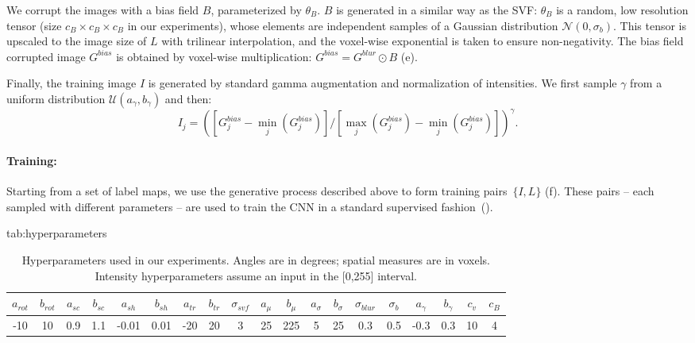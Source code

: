 \documentclass{midl}
\begin{document}
We corrupt the images with a bias field $B$, parameterized by $\theta_B$.  $B$ is generated in a similar way as the SVF: $\theta_B$ is a random, low resolution tensor (size $c_B\times c_B \times c_B$ in our experiments), whose elements are independent samples of a Gaussian distribution $\mathcal{N}(0,\sigma_b)$. This tensor is upscaled to the image size of $L$ with trilinear interpolation, and the voxel-wise exponential is taken to ensure non-negativity. The bias field corrupted image $G^{bias}$ is obtained by voxel-wise multiplication: $G^{bias} = G^{blur} \odot B$ (e). 

Finally, the training image $I$ is generated by standard gamma augmentation and normalization of intensities. We first sample $\gamma$  from a uniform distribution $\mathcal{U}(a_\gamma,b_\gamma)$ and then:
\begin{equation}
\label{eq:intensity_augm}
I_j = \left( [G^{bias}_j - \min_{j}(G^{bias}_j)] \bigg/ [\max_{j}(G^{bias}_j)-\min_{j}(G^{bias}_j)] \right)^{\gamma}.
\end{equation}

\paragraph{Training:} Starting from a set of label maps, we use the generative process described above to form training pairs~$\{I, L\}$ (f). These pairs -- each sampled with different parameters -- are used to train the CNN in a standard supervised fashion~(). 


\begin{table}[tbp]
\setlength\tabcolsep{3pt} 
\floatconts
  {tab:hyperparameters}
  {\caption{Hyperparameters used in our experiments. Angles are in degrees;  spatial measures are in voxels. Intensity hyperparameters assume an input in the [0,255] interval.}  
  }
  {\small \begin{tabular}{|c|c|c|c|c|c|c|c|c|c|c|c|c|c|c|c|c|c|c|}
  \hline
 $a_{rot}$ & $b_{rot}$ & $a_{sc}$ & $b_{sc}$ & $a_{sh}$ & $b_{sh}$ & $a_{tr}$ & $b_{tr}$ & $\sigma_{svf}$ & $a_\mu$ & $b_\mu$ & $a_\sigma$ & $b_\sigma$ &$\sigma_{blur}$ & $\sigma_b$ & $a_\gamma$ & $b_\gamma$ & $c_v$ & $c_B$ \\
  \hline
  -10 & 10 & 0.9 & 1.1 & -0.01 & 0.01 & -20 & 20 & 3 & 25 & 225 & 5 & 25 & 0.3 & 0.5 & -0.3 & 0.3 & 10 & 4\\
  \hline
  \end{tabular}}
\end{table}
\end{document}
